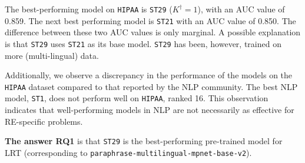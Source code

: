  

The best-performing model on \texttt{HIPAA} is \texttt{ST29} ($K^\dag=1$), with an AUC value of 0.859. The next best performing model is \texttt{ST21} with an AUC value of 0.850. The difference between these two AUC values is only marginal. A possible explanation is that  \texttt{ST29} uses  \texttt{ST21} as its base model.  \texttt{ST29}  has been, however, trained on more (multi-lingual) data.   

Additionally, we observe a discrepancy in the performance of the models on the \texttt{HIPAA} dataset compared to that reported by the NLP community.  
The best NLP model, \texttt{ST1}, does not perform well  on \texttt{HIPAA}, ranked 16. 
This observation indicates that well-performing models in NLP are not necessarily as effective for RE-specific problems. 

\begin{tcolorbox}[arc=1mm,width=\columnwidth,
                  top=0mm,left=0mm,  right=0mm, bottom=0mm,
                  boxrule=1pt, colback=violet!15!white,colframe=white]
\textbf{The answer RQ1} is that \texttt{ST29} is the best-performing pre-trained model for LRT (corresponding to \texttt{paraphrase-multilingual-mpnet-base-v2}). 
\end{tcolorbox}%

%

